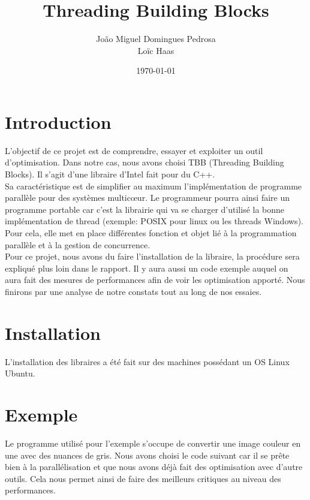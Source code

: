\documentclass[10pt,a4paper]{article}
\author{João Miguel Domingues Pedrosa \\ Loïc Haas}
\title{Threading Building Blocks}
\date{\today}
\begin{document}
\maketitle
\newpage
\tableofcontents
\newpage


\section{Introduction}
L'objectif de ce projet est de comprendre, essayer et exploiter un outil d'optimisation. Dans notre cas, nous avons choisi TBB (Threading Building Blocks). Il s'agit d'une libraire d'Intel fait pour du C++. \\

Sa caractéristique est de simplifier au maximum l'implémentation de programme parallèle pour des systèmes multicœur. Le programmeur pourra ainsi faire un programme portable car c'est la librairie qui va se charger d'utilisé la bonne implémentation de thread (exemple: POSIX pour linux ou les threads Windows). Pour cela, elle met en place différentes fonction et objet lié à la programmation parallèle et à la gestion de concurrence.\\

Pour ce projet, nous avons du faire l'installation de la libraire, la procédure sera expliqué plus loin dans le rapport. Il y aura aussi un code exemple auquel on aura fait des mesures de performances afin de voir les optimisation apporté. Nous finirons par une analyse de notre constats tout au long de nos essaies.
\newpage

\section{Installation}
L'installation des libraires a été fait sur des machines possédant un OS Linux Ubuntu.

\newpage

\section{Exemple}
Le programme utilisé pour l'exemple s'occupe de convertir une image couleur en une avec des nuances de gris. Nous avons choisi le code suivant car il se prête bien à la parallélisation et que nous avons déjà fait des optimisation avec d'autre outils. Cela nous permet ainsi de faire des meilleurs critiques au niveau des performances.
\end{document}
